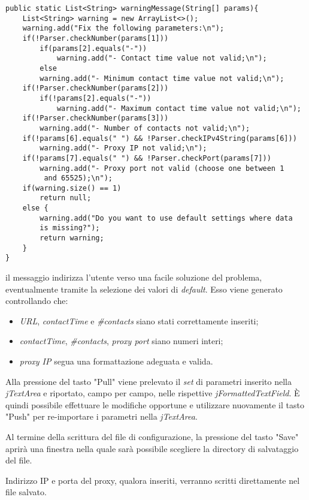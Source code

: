\vspace{0.5cm}
\begin{lstlisting}
public static List<String> warningMessage(String[] params){
	List<String> warning = new ArrayList<>(); 
	warning.add("Fix the following parameters:\n");
	if(!Parser.checkNumber(params[1]))
		if(params[2].equals("-"))
			warning.add("- Contact time value not valid;\n");
		else
		warning.add("- Minimum contact time value not valid;\n");
	if(!Parser.checkNumber(params[2]))
		if(!params[2].equals("-"))
			warning.add("- Maximum contact time value not valid;\n");
	if(!Parser.checkNumber(params[3]))
		warning.add("- Number of contacts not valid;\n");
	if(!params[6].equals(" ") && !Parser.checkIPv4String(params[6]))
		warning.add("- Proxy IP not valid;\n");
	if(!params[7].equals(" ") && !Parser.checkPort(params[7]))
		warning.add("- Proxy port not valid (choose one between 1
		 and 65525);\n");
	if(warning.size() == 1)
		return null;
	else {
		warning.add("Do you want to use default settings where data 
		is missing?");
		return warning;
	}
}
\end{lstlisting}

il messaggio indirizza l'utente verso una facile soluzione del problema, eventualmente tramite la selezione dei valori di \textit{default}.
Esso viene generato controllando che:
\begin{itemize}
	\item \textit{URL}, \textit{contactTime} e \textit{\#contacts} siano stati correttamente inseriti;
	\item \textit{contactTime}, \textit{\#contacts}, \textit{proxy port} siano numeri interi;
	\item \textit{proxy IP} segua una formattazione adeguata e valida.
\end{itemize}

Alla pressione del tasto "Pull" viene prelevato il \textit{set} di parametri inserito nella \textit{jTextArea} e riportato, campo per campo, nelle rispettive \textit{jFormattedTextField}. 
\`{E} quindi possibile effettuare le modifiche opportune e utilizzare nuovamente il tasto "Push" per re-importare i parametri nella \textit{jTextArea}. 

Al termine della scrittura del file di configurazione, la pressione del tasto "Save" aprir\`{a} una finestra nella quale sar\`{a} possibile scegliere la directory di salvataggio del file.

Indirizzo IP e porta del proxy, qualora inseriti, verranno scritti direttamente nel file salvato.

